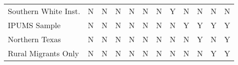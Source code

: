 \begin{tabular}{l*{11}{c}}
Southern White Inst.&        N   &        N   &        N   &        N   &        N   &        N   &        Y   &        N   &        N   &        N   &        N   \\
IPUMS Sample        &        N   &        N   &        N   &        N   &        N   &        N   &        N   &        Y   &        Y   &        Y   &        Y   \\
Northern Texas      &        N   &        N   &        N   &        N   &        N   &        N   &        N   &        N   &        Y   &        N   &        Y   \\
Rural Migrants Only &        N   &        N   &        N   &        N   &        N   &        N   &        N   &        N   &        N   &        Y   &        Y   \\
\bottomrule \end{tabular}
